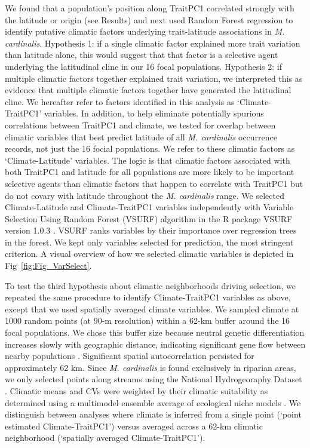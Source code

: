 \documentclass[11pt, oneside]{article}
\newcommand{\pkg}[1]{{\fontseries{b}\selectfont #1}}
\begin{document}
We found that a population's position along TraitPC1 correlated strongly with the latitude or origin (see Results) and next used Random Forest regression \citep{Liaw_Wiener_2002} to identify putative climatic factors underlying trait-latitude associations in \textit{M. cardinalis}. Hypothesis 1: if a single climatic factor explained more trait variation than latitude alone, this would suggest that that factor is a selective agent underlying the latitudinal cline in our 16 focal populations. Hypothesis 2: if multiple climatic factors together explained trait variation,  we interpreted this as evidence that multiple climatic factors together have generated the latitudinal cline. We hereafter refer to factors identified in this analysis as `Climate-TraitPC1' variables. In addition, to help eliminate potentially spurious correlations between TraitPC1 and climate, we tested for overlap between climatic variables that best predict latitude of all \textit{M. cardinalis} occurrence records, not just the 16 focial populations. We refer to these climatic factors as `Climate-Latitude' variables. The logic is that climatic factors associated with both TraitPC1 and latitude for all populations are more likely to be important selective agents than climatic factors that happen to correlate with TraitPC1 but do not covary with latitude throughout the \textit{M. cardinalis} range. We selected Climate-Latitude and Climate-TraitPC1 variables independently with Variable Selection Using Random Forest (VSURF) algorithm in the R package \pkg{VSURF} version 1.0.3 \citep{Genuer_etal_2016}. VSURF ranks variables by their importance over regression trees in the forest. We kept only variables selected for prediction, the most stringent criterion. A visual overview of how we selected climatic variables is depicted in Fig~\ref{fig:Fig_VarSelect}.

To test the third hypothesis about climatic neighborhoods driving selection, we repeated the same procedure to identify Climate-TraitPC1 variables as above, except that we used spatially averaged climate variables. We sampled climate at 1000 random points (at 90-m resolution) within a 62-km buffer around the 16 focal populations. We chose this buffer size because neutral genetic differentiation increases slowly with geographic distance, indicating significant gene flow between nearby populations \citep{Paul_etal_2016}. Significant spatial autocorrelation persisted for approximately 62 km. Since \textit{M. cardinalis} is found exclusively in riparian areas, we only selected points along streams using the National Hydrogeoraphy Dataset \citep{NHD}. Climatic means and CVs were weighted by their climatic suitability as determined using a multimodel ensemble average of ecological niche models \citep{Angert_ENM}. We distinguish between analyses where climate is inferred from a single point (`point estimated Climate-TraitPC1') versus averaged across a 62-km climatic neighborhood (`spatially averaged Climate-TraitPC1'). 
\end{document}
